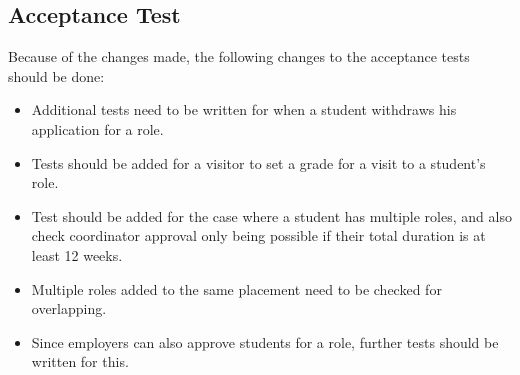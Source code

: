 \documentclass{l3deliverable}
\begin{document}
\subsection{Acceptance Test}
Because of the changes made, the following changes to the acceptance tests should be done:
\begin{itemize}
\item Additional tests need to be written for when a student withdraws his application for a role.
\item Tests should be added for a visitor to set a grade for a visit to a student's role. 
\item Test should be added for the case where a student has multiple roles, and also check coordinator approval only being possible if their total duration is at least 12 weeks.
\item Multiple roles added to the same placement need to be checked for overlapping.
\item Since employers can also approve students for a role, further tests should be written for this.
\end{itemize}
\end{document}
